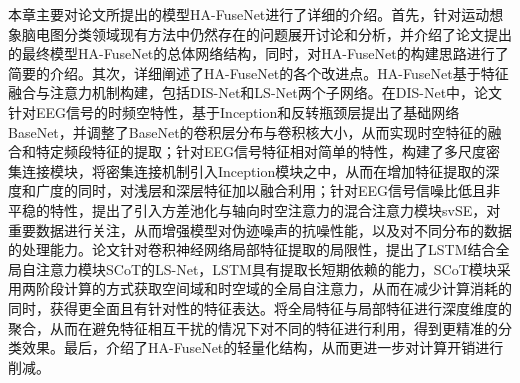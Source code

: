 本章主要对论文所提出的模型HA-FuseNet进行了详细的介绍。首先，针对运动想象脑电图分类领域现有方法中仍然存在的问题展开讨论和分析，并介绍了论文提出的最终模型HA-FuseNet的总体网络结构，同时，对HA-FuseNet的构建思路进行了简要的介绍。其次，详细阐述了HA-FuseNet的各个改进点。HA-FuseNet基于特征融合与注意力机制构建，包括DIS-Net和LS-Net两个子网络。在DIS-Net中，论文针对EEG信号的时频空特性，基于Inception和反转瓶颈层提出了基础网络BaseNet，并调整了BaseNet的卷积层分布与卷积核大小，从而实现时空特征的融合和特定频段特征的提取；针对EEG信号特征相对简单的特性，构建了多尺度密集连接模块，将密集连接机制引入Inception模块之中，从而在增加特征提取的深度和广度的同时，对浅层和深层特征加以融合利用；针对EEG信号信噪比低且非平稳的特性，提出了引入方差池化与轴向时空注意力的混合注意力模块svSE，对重要数据进行关注，从而增强模型对伪迹噪声的抗噪性能，以及对不同分布的数据的处理能力。论文针对卷积神经网络局部特征提取的局限性，提出了LSTM结合全局自注意力模块SCoT的LS-Net，LSTM具有提取长短期依赖的能力，SCoT模块采用两阶段计算的方式获取空间域和时空域的全局自注意力，从而在减少计算消耗的同时，获得更全面且有针对性的特征表达。将全局特征与局部特征进行深度维度的聚合，从而在避免特征相互干扰的情况下对不同的特征进行利用，得到更精准的分类效果。最后，介绍了HA-FuseNet的轻量化结构，从而更进一步对计算开销进行削减。


